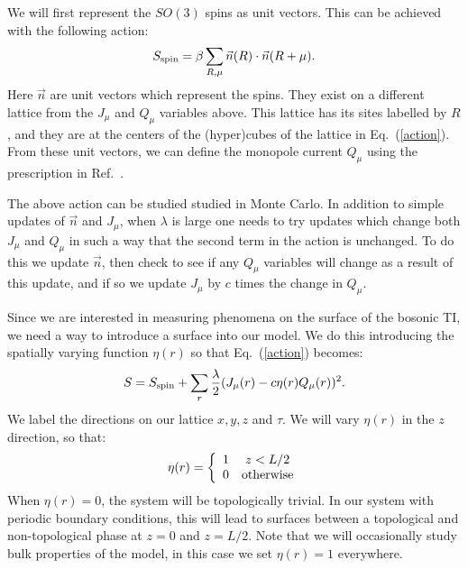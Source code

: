 \documentclass[prb,twocolumn]{revtex4}
\begin{document}
We will first represent the $SO(3)$ spins as unit vectors. This can be achieved with the following action:
\begin{equation}
S_{\rm spin}=\beta\sum_{R,\mu} \vec{n}(R)\cdot \vec{n}(R+\mu).
\end{equation}
Here $\vec{n}$ are unit vectors which represent the spins. They exist on a different lattice from the $J_\mu$ and $Q_\mu$ variables above. This lattice has its sites labelled by $R$, and they are at the centers of the (hyper)cubes of the lattice in Eq.~(\ref{action}). From these unit vectors, we can define the monopole current $Q_\mu$ using the prescription in Ref.~.
 
The above action can be studied studied in Monte Carlo. In addition to simple updates of $\vec{n}$ and $J_\mu$, when $\lambda$ is large one needs to try updates which change both $J_\mu$ and $Q_\mu$ in such a way that the second term in the action is unchanged. To do this we update $\vec{n}$, then check to see if any $Q_\mu$ variables will change as a result of this update, and if so we update $J_\mu$ by $c$ times the change in $Q_\mu$. 

Since we are interested in measuring phenomena on the surface of the bosonic TI, we need a way to introduce a surface into our model. We do this introducing the spatially varying function $\eta(r)$ so that Eq.~(\ref{action}) becomes:
\begin{equation}
S=S_{\rm spin}+\sum_r \frac{\lambda}{2}(J_\mu(r)-c\eta(r) Q_\mu(r))^2.
\end{equation}
We label the directions on our lattice $x,y,z$ and $\tau$. We will vary $\eta(r)$ in the $z$ direction, so that:
\begin{equation}
\eta(r)=
\left\{ \begin{array}{cc}
1 & z<L/2\\
0 & \rm{otherwise}\\
\end{array}\right.
\end{equation}
When $\eta(r)=0$, the system will be topologically trivial. In our system with periodic boundary conditions, this will lead to surfaces between a topological and non-topological phase at $z=0$ and $z=L/2$. Note that we will occasionally study bulk properties of the model, in this case we set $\eta(r)=1$ everywhere.
\end{document}
